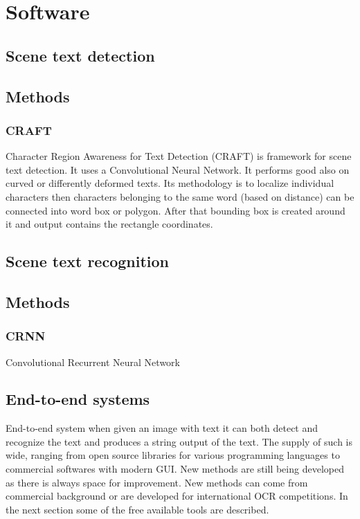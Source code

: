 \chapter{Software}

\section{Scene text detection}

\section*{Methods}
\subsection{CRAFT}

Character Region Awareness for Text Detection (CRAFT) is framework for scene text detection. It uses a Convolutional Neural Network. It performs good also on curved or differently deformed texts. Its methodology is to localize individual characters then characters belonging to the same word (based on distance) can be connected into word box or polygon. After that bounding box is created around it and output contains the rectangle coordinates.\cite{craft2}

\section{Scene text recognition}

\section*{Methods}
\subsection{CRNN}

Convolutional Recurrent Neural Network

\section{End-to-end systems}

End-to-end system when given an image with text it can both detect and recognize the text and produces a string output of the text. The supply of such is wide, ranging from open source libraries for various programming languages to commercial softwares with modern GUI. New methods are still being developed as there is always space for improvement. New methods can come from commercial background or are developed for international OCR competitions. In the next section some of the free available tools are described.

